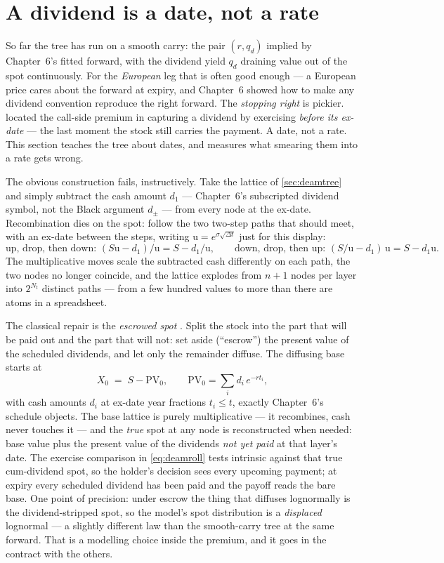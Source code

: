 \section{A dividend is a date, not a rate}
\label{sec:deamdivs}

So far the tree has run on a smooth carry: the pair $(r,q_d)$ implied
by Chapter~6's fitted forward, with the dividend yield $q_d$ draining
value out of the spot continuously.  For the \emph{European} leg that
is often good enough --- a European price cares about the forward at
expiry, and Chapter~6 showed how to make any dividend convention
reproduce the right forward.  The \emph{stopping right} is pickier.
 located the call-side premium in capturing a
dividend by exercising \emph{before its ex-date} --- the last moment
the stock still carries the payment.  A date, not a rate.  This
section teaches the tree about dates, and measures what smearing them
into a rate gets wrong.

The obvious construction fails, instructively.  Take the lattice of
\cref{sec:deamtree} and simply subtract the cash amount $d_1$ ---
Chapter~6's subscripted dividend symbol, not the Black argument
$d_\pm$ --- from every node at the ex-date.  Recombination dies on the spot: follow the
two two-step paths that should meet, with an ex-date between the
steps, writing $\mathrm{u}=e^{\sigma\sqrt{\Delta t}}$ just for this
display:
\[
\text{up, drop, then down: } (S\mathrm{u}-d_1)/\mathrm{u} = S -
d_1/\mathrm{u},
\qquad
\text{down, drop, then up: } (S/\mathrm{u}-d_1)\,\mathrm{u} = S -
d_1\mathrm{u} .
\]
The multiplicative moves scale the subtracted cash differently on
each path, the two nodes no longer coincide, and the lattice explodes
from $n+1$ nodes per layer into $2^{N_t}$ distinct paths --- from a
few hundred values to more than there are atoms in a spreadsheet.

The classical repair is the \emph{escrowed spot}
\citep{Hull2018}.  Split the stock into the part that will be paid out
and the part that will not: set aside (``escrow'') the present value
of the scheduled dividends, and let only the remainder diffuse.  The
diffusing base starts at
\[
X_0 \;=\; S-\mathrm{PV}_0,
\qquad
\mathrm{PV}_0=\textstyle\sum_i d_i\,e^{-r t_i},
\]
with cash amounts $d_i$ at ex-date year fractions $t_i\le t$, exactly
Chapter~6's schedule objects.  The base lattice is purely
multiplicative --- it recombines, cash never touches it --- and the
\emph{true} spot at any node is reconstructed when needed: base value
plus the present value of the dividends \emph{not yet paid} at that
layer's date.  The exercise comparison in \eqref{eq:deamroll} tests
intrinsic against that true cum-dividend spot, so the holder's
decision sees every upcoming payment; at expiry every scheduled
dividend has been paid and the payoff reads the bare base.  One
point of precision: under escrow the thing that diffuses lognormally is the
dividend-stripped spot, so the model's spot distribution is a
\emph{displaced} lognormal --- a slightly different law than the
smooth-carry tree at the same forward.  That is a modelling choice
inside the premium, and it goes in the contract with the others.

